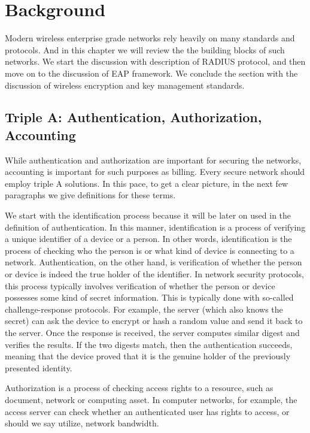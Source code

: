 \section{Background}
\label{section:background}

Modern wireless enterprise grade networks rely heavily on many standards and protocols.
And in this chapter we will review the the building blocks of such networks.
We start the discussion with description of RADIUS protocol, and then
move on to the discussion of EAP framework. We conclude the 
section with the discussion of wireless encryption and key management standards.

\subsection{Triple A: Authentication, Authorization, Accounting}

While authentication and authorization are important for securing the networks, accounting is important for such purposes as billing. Every secure network should employ triple A solutions. In this pace, to get a clear picture, in the next few paragraphs we give definitions for these terms.

We start with the identification process because it will be later on used in the definition of authentication. In this manner, identification is a process of verifying a unique identifier of a device or a person. In other words, identification is the process of checking who the person is or what kind of device is connecting to a network. Authentication, on the other hand, is verification of whether the person or device is indeed the true holder of the identifier. In network security protocols, this process typically involves verification of whether the person or device possesses some kind of secret information. This is typically done with so-called challenge-response protocols. For example, the server (which also knows the secret) can ask the device to encrypt or hash a random value and send it back to the server. Once the response is received, the server computes similar digest and verifies the results. If the two digests match, then the authentication succeeds, meaning that the device proved that it is the genuine holder of the previously presented identity.

Authorization is a process of checking access rights to a resource, such as document, network or computing asset. In computer networks, for example, the access server can check whether an authenticated user has rights to access, or should we say utilize, network bandwidth.


